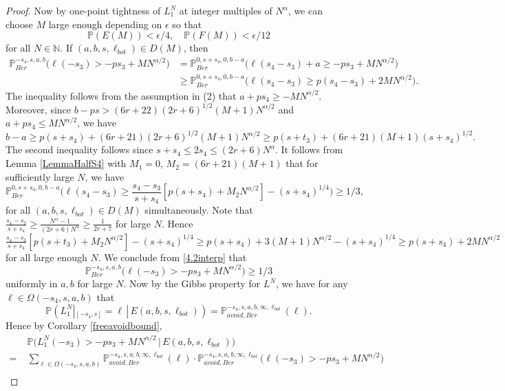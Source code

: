 \begin{proof}
	Now by one-point tightness of $L_1^N$ at integer multiples of $N^\alpha$, we can choose $M$ large enough depending on $\epsilon$ so that
	\begin{equation}
	\mathbb{P}(E(M)) < \epsilon/4, \quad \mathbb{P}(F(M)) < \epsilon/12 \label{4.2EFbounds}
	\end{equation}
	for all $N\in\mathbb{N}$. If $(a,b,s,\ell_{bot})\in D(M)$, then
	\begin{align*}
	\mathbb{P}^{-s_4,s,a,b}_{Ber}\Big( \ell(-s_3) > -ps_3 + MN^{\alpha/2}\Big) &= \mathbb{P}^{0,s+s_4,0,b-a}_{Ber}\Big(\ell(s_4-s_3) + a \geq -ps_3 + MN^{\alpha/2}\Big)\\
	&\geq \mathbb{P}^{0,s+s_4,0,b-a}_{Ber}\Big(\ell(s_4-s_3) \geq p(s_4-s_3) + 2MN^{\alpha/2}\Big).
	\end{align*}
	The inequality follows from the assumption in (2) that $a+ps_4 \geq -MN^{\alpha/2}$. Moreover, since $b-ps > (6r+22)(2r+6)^{1/2}(M+1)N^{\alpha/2}$ and $a+ps_4 \leq MN^{\alpha/2}$, we have 
	\[
	b-a \geq p(s+s_4) + (6r+21)(2r+6)^{1/2}(M+1)N^{\alpha/2} \geq p(s+t_3) + (6r+21)(M+1)(s+s_4)^{1/2}.
	\]  
	The second inequality follows since $s+s_4 \leq 2s_4 \leq (2r+6)N^{\alpha}$. It follows from Lemma \ref{LemmaHalfS4} with $M_1 = 0$, $M_2 = (6r+21)(M+1)$ that for sufficiently large $N$, we have
	\begin{equation}
	\mathbb{P}^{0,s+s_4,0,b-a}_{Ber}\Big(\ell(s_4-s_3) \geq \frac{s_4-s_3}{s+s_4}[p(s+s_4) + M_2 N^{\alpha/2}] - (s+s_4)^{1/4}\Big) \geq 1/3, \label{4.2interp}
	\end{equation}
	for all $(a,b,s,\ell_{bot}) \in D(M)$ simultaneously. Note that $\frac{s_4-s_3}{s+s_4} \geq \frac{N^\alpha - 1}{(2r+6)N^\alpha} \geq \frac{1}{2r+7}$
	for large $N$. Hence $\frac{s_4-s_3}{s+s_4}[p(s+t_3) + M_2 N^{\alpha/2}] - (s+s_4)^{1/4} \geq p(s+s_4) + 3(M+1)N^{\alpha/2} - (s+s_4)^{1/4}\geq p(s+s_4) + 2MN^{\alpha/2}$ for all large enough $N$. We conclude from \eqref{4.2interp} that
	\[
	\mathbb{P}^{-s_4,s,a,b}_{Ber}\Big(\ell(-s_3) > -ps_3 + MN^{\alpha/2}\Big) \geq 1/3
	\]
	uniformly in $a,b$ for large $N$. Now by the Gibbs property for $L^N$, we have for any $\ell\in\Omega(-s_4,s,a,b)$ that
	\[
	\mathbb{P}(L_1^N|_{[-s_4,s]} = \ell\,|\,E(a,b,s,\ell_{bot})) = \mathbb{P}^{-s_4,s,a,b,\infty,\ell_{bot}}_{avoid, Ber}(\ell).
	\]
	Hence by Corollary \ref{freeavoidbound},
	\begin{align*}
	&\mathbb{P}\big( L_1^N(-s_3) > -ps_3 + MN^{\alpha/2}\,\big|\,E(a,b,s,\ell_{bot})\big)\\
	= \; & \sum_{\ell\in\Omega(-s_4,s,a,b)} \mathbb{P}^{-s_4,s,a,b,\infty,\ell_{bot}}_{avoid, Ber}(\ell)\cdot \mathbb{P}^{-s_4,s,a,b,\infty,\ell_{bot}}_{avoid, Ber}\big(\ell(-s_3) > -ps_3 + MN^{\alpha/2}\big)\\

\end{align*}
\end{proof}
